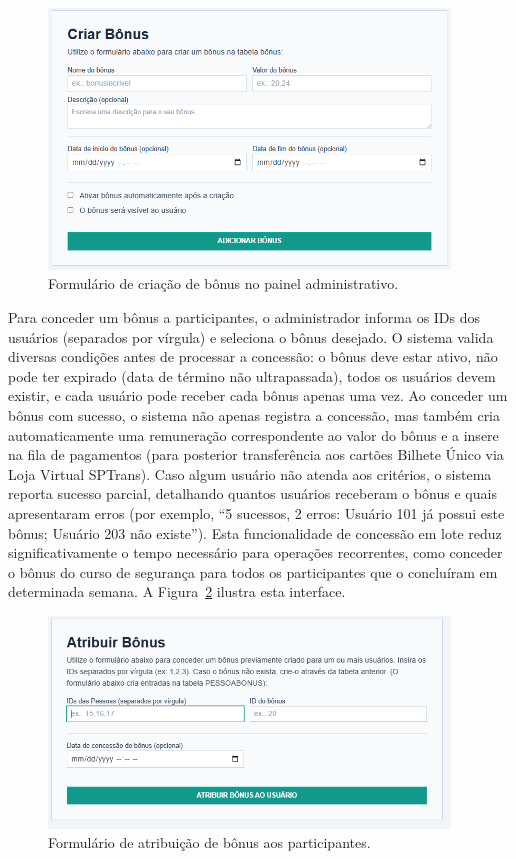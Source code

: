  \begin{figure}[htb]
   \centering
   \includegraphics[width=0.95\textwidth]{figuras/criar_bonus.PNG}
   \caption{Formulário de criação de bônus no painel administrativo.}
   \label{fig:bonus_criar_form}
 \end{figure}

Para conceder um bônus a participantes, o
administrador informa os IDs dos usuários (separados por vírgula) e seleciona o
bônus desejado. O sistema valida diversas condições antes de processar a
concessão: o bônus deve estar ativo, não pode ter expirado (data de término não
ultrapassada), todos os usuários devem existir, e cada usuário pode receber cada
bônus apenas uma vez. Ao conceder um bônus com sucesso, o sistema não apenas registra a concessão, mas
também cria automaticamente uma remuneração correspondente ao valor do bônus e a
insere na fila de pagamentos (para posterior transferência aos cartões Bilhete
Único via Loja Virtual SPTrans). Caso algum usuário não atenda aos critérios, o
sistema reporta sucesso parcial, detalhando quantos usuários receberam o bônus e
quais apresentaram erros (por exemplo, ``5 sucessos, 2 erros: Usuário 101 já
possui este bônus; Usuário 203 não existe''). Esta funcionalidade de concessão em
lote reduz significativamente o tempo necessário para operações recorrentes, como
conceder o bônus do curso de segurança para todos os participantes que o
concluíram em determinada semana. A Figura~\ref{fig:bonus_atribuir_form} ilustra esta interface.

 \begin{figure}[htb]
   \centering
   \includegraphics[width=0.95\textwidth]{figuras/atribuir_bonus.PNG}
   \caption{Formulário de atribuição de bônus aos participantes.}
   \label{fig:bonus_atribuir_form}
 \end{figure}

